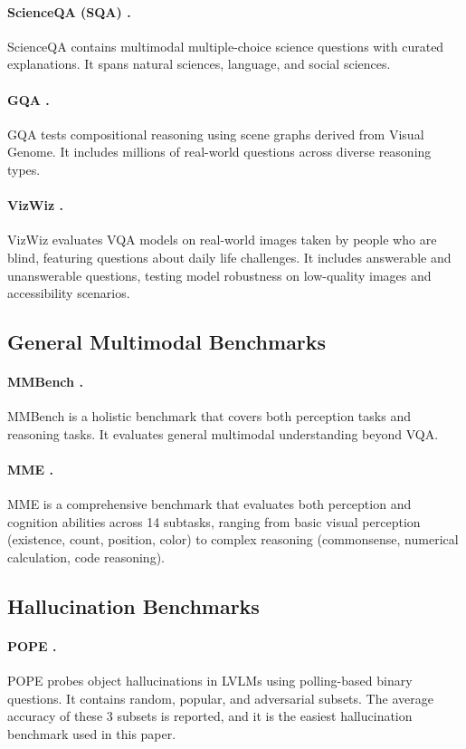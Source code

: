 \documentclass[11pt]{article}
\begin{document}
\paragraph{ScienceQA (SQA) \citep{lu2022learn}.}
ScienceQA contains multimodal multiple-choice science questions with curated explanations. It spans natural sciences, language, and social sciences.

\paragraph{GQA \citep{hudson2019gqa}.}
GQA tests compositional reasoning using scene graphs derived from Visual Genome. It includes millions of real-world questions across diverse reasoning types.  


\paragraph{VizWiz \citep{gurari2018vizwiz}.}
VizWiz evaluates VQA models on real-world images taken by people who are blind, featuring questions about daily life challenges. It includes answerable and unanswerable questions, testing model robustness on low-quality images and accessibility scenarios.

\subsection{General Multimodal Benchmarks}
\paragraph{MMBench \citep{lu2022learn}.}
MMBench is a holistic benchmark that covers both perception tasks and reasoning tasks. It evaluates general multimodal understanding beyond VQA.

\paragraph{MME \citep{fu2023mme}.}
MME is a comprehensive benchmark that evaluates both perception and cognition abilities across 14 subtasks, ranging from basic visual perception (existence, count, position, color) to complex reasoning (commonsense, numerical calculation, code reasoning).


\subsection{Hallucination Benchmarks}
\paragraph{POPE \citep{li2023evaluating}.}
POPE probes object hallucinations in LVLMs using polling-based binary questions. It contains random, popular, and adversarial subsets. The average accuracy of these 3 subsets is reported, and it is the easiest hallucination benchmark used in this paper.  
\end{document}
